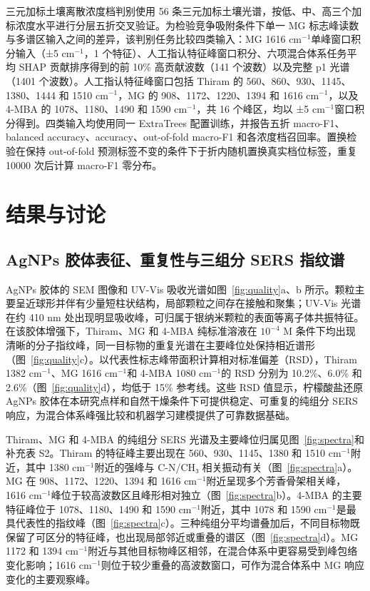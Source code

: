 \documentclass[preprint,12pt]{elsarticle}
\newcommand{\cmone}{cm$^{-1}$}
\begin{document}
三元加标土壤离散浓度档判别使用 56 条三元加标土壤光谱，按低、中、高三个加标浓度水平进行分层五折交叉验证。为检验竞争吸附条件下单一 MG 标志峰读数与多谱区输入之间的差异，该判别任务比较四类输入：MG 1616 \cmone 单峰窗口积分输入（±5 \cmone，1 个特征）、人工指认特征峰窗口积分、六项混合体系任务平均 SHAP 贡献排序得到的前 10\% 高贡献波数（141 个波数）以及完整 p1 光谱（1401 个波数）。人工指认特征峰窗口包括 Thiram 的 560、860、930、1145、1380、1444 和 1510 \cmone，MG 的 908、1172、1220、1394 和 1616 \cmone，以及 4-MBA 的 1078、1180、1490 和 1590 \cmone，共 16 个峰区，均以 ±5 \cmone 窗口积分得到。四类输入均使用同一 ExtraTrees 配置训练，并报告五折 macro-F1、balanced accuracy、accuracy、out-of-fold macro-F1 和各浓度档召回率。置换检验在保持 out-of-fold 预测标签不变的条件下于折内随机置换真实档位标签，重复 10000 次后计算 macro-F1 零分布。

\section{结果与讨论}

\subsection{AgNPs 胶体表征、重复性与三组分 SERS 指纹谱}

AgNPs 胶体的 SEM 图像和 UV-Vis 吸收光谱如图~\ref{fig:quality}a、b 所示。颗粒主要呈近球形并伴有少量短柱状结构，局部颗粒之间存在接触和聚集；UV-Vis 光谱在约 410 nm 处出现明显吸收峰，可归属于银纳米颗粒的表面等离子体共振特征\cite{ref11}。在该胶体增强下，Thiram、MG 和 4-MBA 纯标准溶液在 \(10^{-4}\) M 条件下均出现清晰的分子指纹峰，同一目标物的重复光谱在主要峰位处保持相近谱形（图~\ref{fig:quality}c）。以代表性标志峰带面积计算相对标准偏差（RSD），Thiram 1382 \cmone、MG 1616 \cmone 和 4-MBA 1080 \cmone 的 RSD 分别为 10.2\%、6.0\% 和 2.6\%（图~\ref{fig:quality}d），均低于 15\% 参考线。这些 RSD 值显示，柠檬酸盐还原 AgNPs 胶体在本研究点样和自然干燥条件下可提供稳定、可重复的纯组分 SERS 响应，为混合体系峰强比较和机器学习建模提供了可靠数据基础\cite{ref1,ref6}。

Thiram、MG 和 4-MBA 的纯组分 SERS 光谱及主要峰位归属见图~\ref{fig:spectra}和补充表 S2。Thiram 的特征峰主要出现在 560、930、1145、1380 和 1510 \cmone 附近，其中 1380 \cmone 附近的强峰与 C-N/CH₃ 相关振动有关（图~\ref{fig:spectra}a）\cite{ref2,ref5,ref24}。MG 在 908、1172、1220、1394 和 1616 \cmone 附近呈现多个芳香骨架相关峰，1616 \cmone 峰位于较高波数区且峰形相对独立（图~\ref{fig:spectra}b）\cite{ref22,ref23}。4-MBA 的主要特征峰位于 1078、1180、1490 和 1590 \cmone 附近，其中 1078 和 1590 \cmone 是最具代表性的指纹峰（图~\ref{fig:spectra}c）\cite{ref6}。三种纯组分平均谱叠加后，不同目标物既保留了可区分的特征峰，也出现局部邻近或重叠的谱区（图~\ref{fig:spectra}d）。MG 1172 和 1394 \cmone 附近与其他目标物峰区相邻，在混合体系中更容易受到峰包络变化影响；1616 \cmone 则位于较少重叠的高波数窗口，可作为混合体系中 MG 响应变化的主要观察峰。
\end{document}

